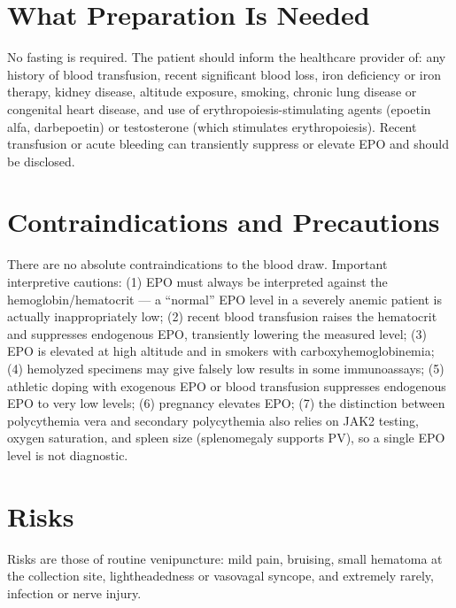 \section*{What Preparation Is Needed}
No fasting is required. The patient should inform the healthcare provider of: any history of blood transfusion, recent significant blood loss, iron deficiency or iron therapy, kidney disease, altitude exposure, smoking, chronic lung disease or congenital heart disease, and use of erythropoiesis-stimulating agents (epoetin alfa, darbepoetin) or testosterone (which stimulates erythropoiesis). Recent transfusion or acute bleeding can transiently suppress or elevate EPO and should be disclosed.

\section*{Contraindications and Precautions}
There are no absolute contraindications to the blood draw. Important interpretive cautions: (1) EPO must always be interpreted against the hemoglobin/hematocrit --- a ``normal'' EPO level in a severely anemic patient is actually inappropriately low; (2) recent blood transfusion raises the hematocrit and suppresses endogenous EPO, transiently lowering the measured level; (3) EPO is elevated at high altitude and in smokers with carboxyhemoglobinemia; (4) hemolyzed specimens may give falsely low results in some immunoassays; (5) athletic doping with exogenous EPO or blood transfusion suppresses endogenous EPO to very low levels; (6) pregnancy elevates EPO; (7) the distinction between polycythemia vera and secondary polycythemia also relies on JAK2 testing, oxygen saturation, and spleen size (splenomegaly supports PV), so a single EPO level is not diagnostic.

\section*{Risks}
Risks are those of routine venipuncture: mild pain, bruising, small hematoma at the collection site, lightheadedness or vasovagal syncope, and extremely rarely, infection or nerve injury.

